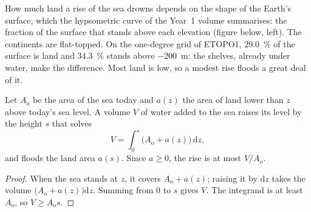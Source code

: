 How much land a rise of the sea drowns depends on the shape of the Earth's surface, which the
hypsometric curve of the Year~1 volume summarises: the fraction of the surface that stands above
each elevation (figure below, left). The continents are flat-topped. On the one-degree grid of
ETOPO1, \qty{29.0}{\percent} of the surface is land and \qty{34.3}{\percent} stands above
\qty{-200}{m}: the shelves, already under water, make the difference. Most land is low, so a
modest rise floods a great deal of it.

\begin{proposition}\label{prop:b2:phanerozoic-earth:flooding}
Let $A_{\text{o}}$ be the area of the sea today and $a(z)$ the area of land lower than $z$ above
today's sea level. A volume $V$ of water added to the sea raises its level by the height $s$
that solves
\[
V = \int_0^s \bigl(A_{\text{o}} + a(z)\bigr)\,\mathrm{d}z ,
\]
and floods the land area $a(s)$. Since $a \ge 0$, the rise is at most $V/A_{\text{o}}$.
\end{proposition}

\begin{proof}
When the sea stands at $z$, it covers $A_{\text{o}} + a(z)$; raising it by $\mathrm{d}z$ takes
the volume $\bigl(A_{\text{o}} + a(z)\bigr)\mathrm{d}z$. Summing from 0 to $s$ gives $V$. The
integrand is at least $A_{\text{o}}$, so $V \ge A_{\text{o}}s$.
\end{proof}

